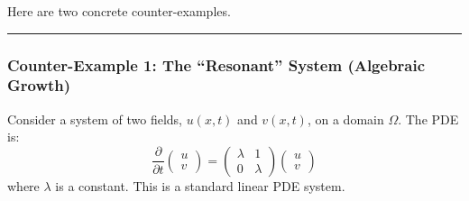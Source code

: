 \documentclass[oneside]{book}
\begin{document}
Here are two concrete counter-examples.

\noindent\rule{\textwidth}{0.4pt}

\subsubsection*{Counter-Example 1: The ``Resonant'' System (Algebraic Growth)}
Consider a system of two fields, $u(x,t)$ and $v(x,t)$, on a domain $\Omega$. The PDE is:
\[
\frac{\partial}{\partial t} \begin{pmatrix} u \\ v \end{pmatrix} = \begin{pmatrix} \lambda & 1 \\ 0 & \lambda \end{pmatrix} \begin{pmatrix} u \\ v \end{pmatrix}
\]
where $\lambda$ is a constant. This is a standard linear PDE system.
\end{document}

